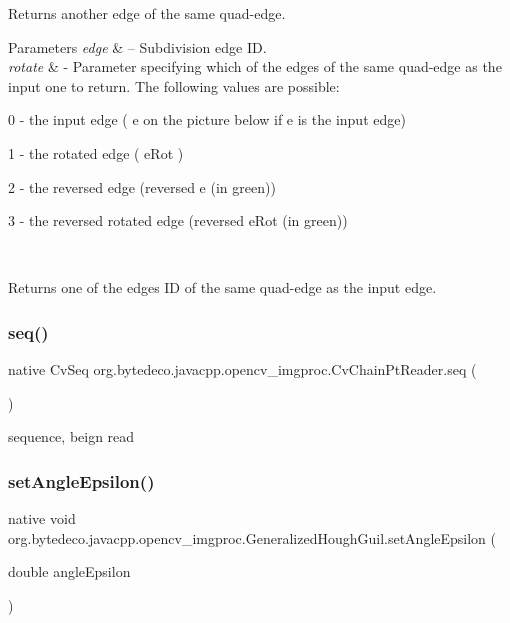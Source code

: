 Returns another edge of the same quad-\/edge. 


\begin{DoxyParams}{Parameters}
{\em edge} & – Subdivision edge ID. \\
\hline
{\em rotate} & -\/ Parameter specifying which of the edges of the same quad-\/edge as the input one to return. The following values are possible\+:
\begin{DoxyItemize}
\item 0 -\/ the input edge ( e on the picture below if e is the input edge)
\item 1 -\/ the rotated edge ( e\+Rot )
\item 2 -\/ the reversed edge (reversed e (in green))
\item 3 -\/ the reversed rotated edge (reversed e\+Rot (in green)) 
\end{DoxyItemize}\\
\hline
\end{DoxyParams}
\begin{DoxyReturn}{Returns}
one of the edges ID of the same quad-\/edge as the input edge. 
\end{DoxyReturn}
\mbox{\label{group__imgproc_gac12edf088fb6665990d9ed77569fa2fc}} 
\subsubsection{\texorpdfstring{seq()}{seq()}}
{\footnotesize\ttfamily native Cv\+Seq org.\+bytedeco.\+javacpp.\+opencv\+\_\+imgproc.\+Cv\+Chain\+Pt\+Reader.\+seq (\begin{DoxyParamCaption}{ }\end{DoxyParamCaption})}

sequence, beign read \mbox{\label{group__imgproc_ga2c1a3aa315145492af4bf215d6180713}} 
\subsubsection{\texorpdfstring{set\+Angle\+Epsilon()}{setAngleEpsilon()}}
{\footnotesize\ttfamily native void org.\+bytedeco.\+javacpp.\+opencv\+\_\+imgproc.\+Generalized\+Hough\+Guil.\+set\+Angle\+Epsilon (\begin{DoxyParamCaption}\item[{double}]{angle\+Epsilon }\end{DoxyParamCaption})}

